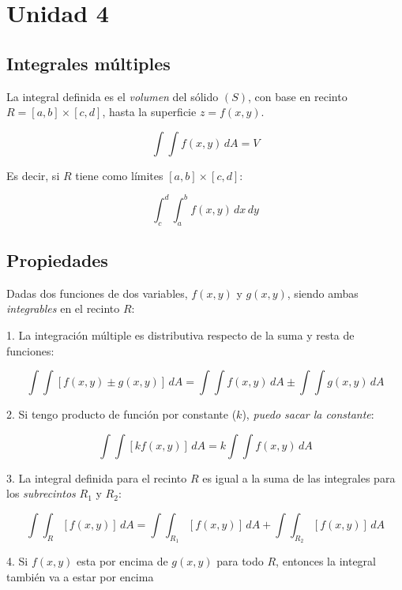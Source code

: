 \setcounter{section}{3}

\section{Unidad 4}

\subsection{Integrales múltiples}

La integral definida es el \textit{volumen} del sólido \((S)\),
con base en recinto \(R = [a,b] \times [c,d]\),
hasta la superficie \(z = f(x,y)\).

\begin{equation*}
    \int\int f(x,y)\,dA = V
\end{equation*}

Es decir, si \(R\) tiene como límites \([a,b] \times [c,d]\):

\begin{equation*}
    \int_{c}^{d}\int_{a}^{b} f(x,y) \,dx\,dy
\end{equation*}

\subsection{Propiedades}

Dadas dos funciones de dos variables,
\(f(x,y)\) y \(g(x,y)\),
siendo ambas \textit{integrables} en el recinto \(R\):

1. La integración múltiple es distributiva respecto de la suma y resta de funciones:

\begin{equation*}
    \int\int [f(x,y) \pm g(x,y)] \,dA = \int\int f(x,y) \,dA \pm \int\int g(x,y) \,dA
\end{equation*}

2. Si tengo producto de función por constante (\(k\)), \textit{puedo sacar la constante}:

\begin{equation*}
    \int\int [kf(x,y)] \,dA = k \int\int f(x,y) \,dA
\end{equation*}

3. La integral definida para el recinto \(R\) es igual a la suma de las integrales para los \textit{subrecintos} \(R_1\) y \(R_2\):

\begin{equation*}
    \int\int_R [f(x,y)] \,dA = \int\int_{R_1} [f(x,y)] \,dA + \int\int_{R_2} [f(x,y)] \,dA
\end{equation*}

4. Si \(f(x,y)\) esta por encima de \(g(x,y)\) para todo \(R\), entonces la integral también va a estar por encima
